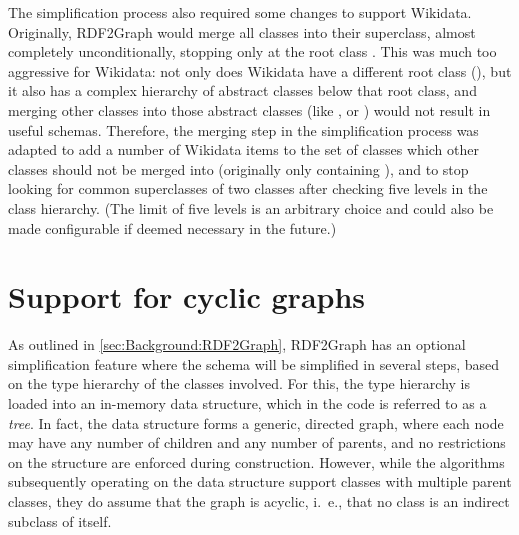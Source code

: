 The simplification process also required some changes to support Wikidata.
Originally, RDF2Graph would merge all classes into their superclass,
almost completely unconditionally,
stopping only at the root class .
This was much too aggressive for Wikidata:
not only does Wikidata have a different root class (),
but it also has a complex hierarchy of abstract classes below that root class,
and merging other classes into those abstract classes
(like ,  or )
would not result in useful schemas.
Therefore, the merging step in the simplification process was adapted %
to add a number of Wikidata items to the set of classes which other classes should not be merged into
(originally only containing ),
and to stop looking for common superclasses of two classes after checking five levels in the class hierarchy.
(The limit of five levels is an arbitrary choice
and could also be made configurable if deemed necessary in the future.) %

\section{Support for cyclic graphs}
\label{sec:RDF2Graph+Wikidata:cyclic-graphs}

As outlined in \cref{sec:Background:RDF2Graph}, %
RDF2Graph has an optional simplification feature
where the schema will be simplified in several steps,
based on the type hierarchy of the classes involved.
For this, the type hierarchy is loaded into an in-memory data structure,
which in the code is referred to as a \emph{tree}. %
In fact, the data structure forms a generic, directed graph,
where each node may have any number of children and any number of parents,
and no restrictions on the structure are enforced during construction.
However, while the algorithms subsequently operating on the data structure support classes with multiple parent classes,
they do assume that the graph is acyclic,
i.~e., that no class is an indirect subclass of itself.

